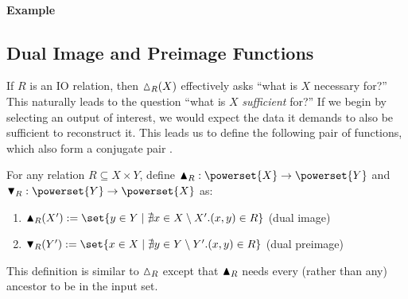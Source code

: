 \vspace{0.2cm}
\paragraph{Example}


\subsection{Dual Image and Preimage Functions}

If $R$ is an IO relation, then $\demandedByR_R(X)$ effectively asks ``what is $X$ necessary for?'' This
naturally leads to the question ``what is $X$ \emph{sufficient} for?'' If we begin by selecting an output of
interest, we would expect the data it demands to also be sufficient to reconstruct it. This leads us to define
the following pair of functions, which also form a conjugate pair .

\begin{definition}
   For any relation $R \subseteq X \times Y$, define $\sufficesR_R: \powerset{X} \to \powerset{Y}$ and
   $\preimageDualR_R: \powerset{Y} \to \powerset{X}$ as:
   \begin{enumerate}
      \item $\sufficesR_R(X') \eqdef \set{y \in Y \mid \nexists x \in X \setminus X'.(x, y) \in R}$ \hfill (dual image)
      \item $\preimageDualR_R(Y') \eqdef \set{x \in X \mid \nexists y \in Y \setminus Y'.(x, y) \in R}$ \hfill (dual preimage)
   \end{enumerate}
\end{definition}

This definition is similar to $\demandedByR_R$ except that $\blacktriangle_R$ needs every (rather than any)
ancestor to be in the input set. 

